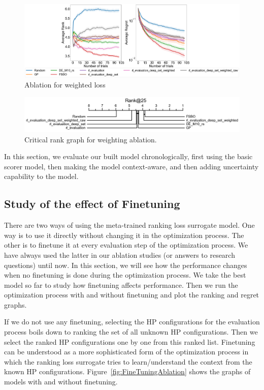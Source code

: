 \documentclass[12pt, twoside, ngerman]{report}
\begin{document}
\begin{figure}[h]
  \centering
    \includegraphics[scale=0.20]{images/RLDeepSetWeighted}
    \caption{Ablation for weighted loss}
    \label{fig:RLDeepSetWeighted}
\end{figure}

\begin{figure}[h]
  \centering
    \includegraphics[scale=0.35]{images/RLDeepSetWeightedRank25}
    \caption{Critical rank graph for weighting ablation.}
    \label{fig:RLDeepSetWeightedRank25}
\end{figure}

In this section, we evaluate our built model chronologically, first using the basic scorer model,  then making the model context-aware, and then adding uncertainty capability to the model.
\fi

\subsection{Study of the effect of Finetuning}
\label{sec:EffectOfFineTuningResults}
There are two ways of using the meta-trained ranking loss surrogate model. One way is to use it directly without changing it in the optimization process. The other is to finetune it at every evaluation step of the optimization process. We have always used the latter in our ablation studies (or answers to research questions) until now.
In this section, we will see how the performance changes when no finetuning is done during the optimization process.
We take the best model so far to study how finetuning affects performance. Then we run the optimization process with and without finetuning and plot the ranking and regret graphs.

If we do not use any finetuning, selecting the HP configurations for the evaluation process boils down to ranking the set of all unknown HP configurations. Then we select the ranked HP configurations one by one from this ranked list. Finetuning can be understood as a more sophisticated form of the optimization process in which the ranking loss surrogate tries to learn/understand the context from the known HP configurations. Figure~\ref{fig:FineTuningAblation} shows the graphs of models with and without finetuning.
\end{document}
